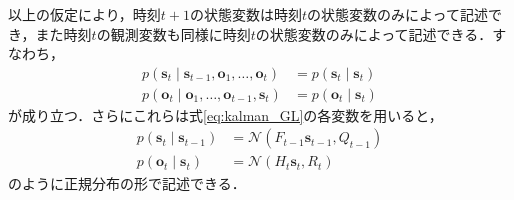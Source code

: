         以上の仮定により，時刻$t+1$の状態変数は時刻$t$の状態変数のみによって記述でき，また時刻$t$の観測変数も同様に時刻$t$の状態変数のみによって記述できる．すなわち，
        \begin{equation}
            \label{eq:kalman_with_markov}
            \begin{aligned}
                p(\bm{s}_{t} \mid \bm{s}_{t-1}, \bm{o}_1, \dots, \bm{o}_t) &= p(\bm{s}_t \mid \bm{s}_t)
                \\p(\bm{o}_t \mid \bm{o}_1, \dots, \bm{o}_{t-1}, \bm{s}_t) &= p(\bm{o}_t \mid \bm{s}_t)
            \end{aligned}
        \end{equation}
        が成り立つ．さらにこれらは式\ref{eq:kalman_GL}の各変数を用いると，
        \begin{equation}
            \label{eq:linear_transition_and_observation}
            \begin{aligned}
                p(\bm{s}_t \mid \bm{s}_{t-1}) &= \mathcal{N}(F_{t-1} \bm{s}_{t-1}, Q_{t-1})
                \\ p(\bm{o}_t \mid \bm{s}_t) &= \mathcal{N}(H_t \bm{s}_{t}, R_t)
            \end{aligned}
        \end{equation}
        のように正規分布の形で記述できる．

